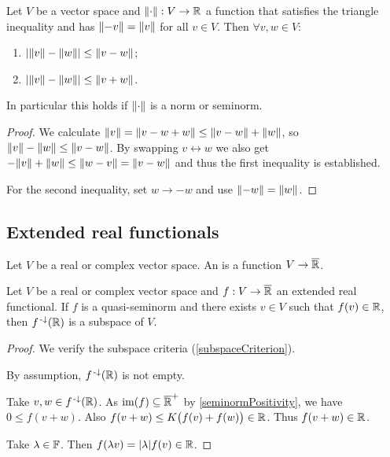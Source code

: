 \begin{proposition} \label{reverseTriangleInequality}
Let $V$ be a vector space and $\lVert\cdot\rVert: V\to \mathbb{R}$ a function that satisfies the triangle inequality and has $\lVert-v\rVert = \lVert v\rVert$ for all $v\in V$. Then $\forall v,w\in V$:
\begin{enumerate}
\item $|\lVert v\rVert-\lVert w\rVert|\leq \lVert v-w\rVert$;
\item $|\lVert v\rVert-\lVert w\rVert|\leq \lVert v+w\rVert$.
\end{enumerate}
In particular this holds if $\lVert\cdot\rVert$ is a norm or seminorm.
\end{proposition}
\begin{proof}
We calculate $\lVert v\rVert = \lVert v-w+w\rVert \leq \lVert v-w\rVert + \lVert w\rVert$, so $\lVert v\rVert-\lVert w\rVert\leq \lVert v-w\rVert$. By swapping $v\leftrightarrow w$ we also get $-\lVert v\rVert+\lVert w\rVert\leq \lVert w-v\rVert = \lVert v-w\rVert$ and thus the first inequality is established.

For the second inequality, set $w\to -w$ and use $\lVert-w\rVert = \lVert w\rVert$.
\end{proof}

\subsection{Extended real functionals}
\begin{definition}
Let $V$ be a real or complex vector space. An  is a function $V \to \overline{\mathbb{R}}$.
\end{definition}

\begin{lemma} \label{realPartExtendedRealFunctional}
Let $V$ be a real or complex vector space and $f: V\to \overline{\mathbb{R}}$ an extended real functional. If $f$ is a quasi-seminorm and there exists $v\in V$ such that $f(v)\in\mathbb{R}$, then $f^{{\text{\hspace{0.15em}-}\downarrow}}(\mathbb{R})$ is a subspace of $V$. 
\end{lemma}
\begin{proof}
We verify the subspace criteria (\ref{subspaceCriterion}). 

By assumption, $f^{{\text{\hspace{0.15em}-}\downarrow}}(\mathbb{R})$ is not empty.

Take $v,w\in f^{{\text{\hspace{0.15em}-}\downarrow}}(\mathbb{R})$. As $\operatorname{im}(f) \subseteq \overline{\mathbb{R}}^+$ by \ref{seminormPositivity}, we have $0\leq f(v+w)$. Also $f(v+w)\leq K\big(f(v)+f(w)\big)\in \mathbb{R}$. Thus $f(v+w)\in\mathbb{R}$.

Take $\lambda\in\mathbb{F}$. Then $f(\lambda v) = |\lambda|f(v)\in \mathbb{R}$.
\end{proof}

